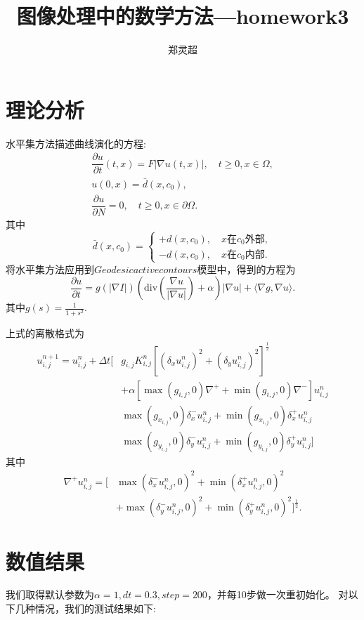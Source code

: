 \documentclass[a4paper,  11pt]{ctexart}
\newcommand\pd[2]{\dfrac{\partial {#1}}{\partial {#2}}}
\begin{document}
\title{图像处理中的数学方法—homework3}
\author{郑灵超}
\maketitle

\section{理论分析}
  水平集方法描述曲线演化的方程:
  \begin{align}
    \pd{u}{t}(t,x) = F|\nabla u(t,x)|, \quad t\geq 0,x\in\Omega, \\
    u(0,x)=\bar{d}(x,c_0),\\
    \pd{u}{N}=0,\quad t\geq 0,x\in\partial\Omega.
  \end{align}
  其中
  \[\bar{d}(x,c_0)=
  \begin{cases}
    +d(x,c_0) ,\quad x \text{在}c_0\text{外部},\\
    -d(x,c_0) ,\quad x \text{在}c_0\text{内部}.
  \end{cases}
  \]
  将水平集方法应用到$Geodesic active contours$模型中，得到的方程为
  \[
  \pd{u}{t}=g(|\nabla I|)\left(\text{div}\left(\frac{\nabla u}{
  |\nabla u|}\right)+\alpha\right)|\nabla u|+\langle\nabla g,\nabla
  u\rangle.
  \]
  其中$g(s)=\frac{1}{1+s^2}$.

  上式的离散格式为
  \[
  \begin{aligned}
    u_{i,j}^{n+1}=u_{i,j}^n + \Delta t \Big[ & g_{i,j}K_{i,j}^n
    [(\delta_x u_{i,j}^n)^2+(\delta_y u_{i,j}^n)^2]^{\frac 12} \\
    &
    +\alpha[\max(g_{i,j},0)\nabla^++\min(g_{i,j},0)\nabla^-]u_{i,j}^n\\
    &\max(g_{x_{i,j}},0)\delta_x^- u_{i,j}^n+\min(g_{x_{i,j}},0)\delta_x^+
    u_{i,j}^n \\
    &\max(g_{y_{i,j}},0)\delta_y^- u_{i,j}^n+\min(g_{y_{i,j}},0)\delta_y^+
    u_{i,j}^n \Big]
  \end{aligned}
  \]
其中 
\[
\begin{aligned}
  \nabla^+ u_{i,j}^n = \Big[
  &\max(\delta_x^-u_{i,j}^n,0)^2 
  +\min(\delta_x^+u_{i,j}^n,0)^2 \\
  &+\max(\delta_y^-u_{i,j}^n,0)^2 
  +\min(\delta_y^+u_{i,j}^n,0)^2 
  \Big]^{\frac 12}.
\end{aligned}
\]

\section{数值结果}
我们取得默认参数为$\alpha=1,dt=0.3,step=200$，并每10步做一次重初始化。
对以下几种情况，我们的测试结果如下:
\end{document}
